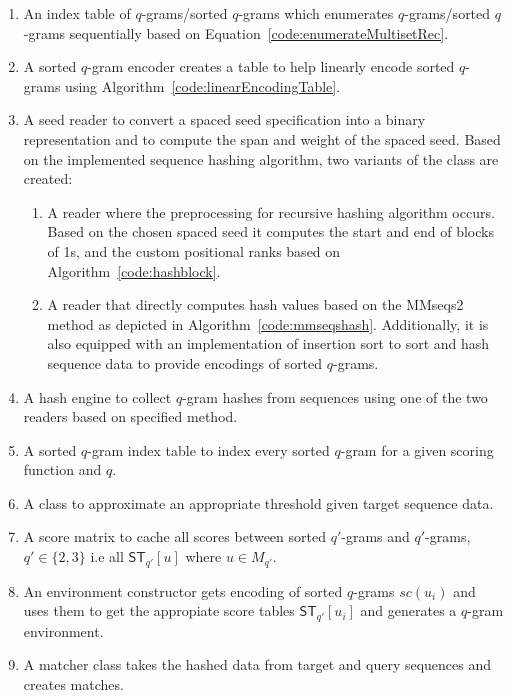\documentclass[twoside,a4paper,bsc]{master}
\newcommand{\Qgram}[1]{\(#1\)-gram}
\newcommand{\Scoretablename}[0]{\mathsf{ST}}
\newcommand{\Scoretable}[2]{\Scoretablename_{#1}[#2]}
\begin{document}
\begin{enumerate}
\item An index table of \Qgram{q}s/sorted \Qgram{q}s which enumerates
\Qgram{q}s/sorted \Qgram{q}s sequentially based on 
Equation~\ref{code:enumerateMultisetRec}.

\item A sorted \Qgram{q} encoder creates a table to help linearly encode
sorted \Qgram{q}s using Algorithm~\ref{code:linearEncodingTable}.

\item A seed reader to convert a spaced seed specification into a binary
representation and to compute the span and weight of the spaced seed.
Based on the implemented sequence hashing algorithm, two variants of the
class are created:

\begin{enumerate}
\item A reader where the preprocessing for recursive hashing algorithm occurs.
Based on the chosen spaced seed it computes the start and end of blocks of 1s,
and the custom positional ranks based on Algorithm~\ref{code:hashblock}.
\item A reader that directly computes hash values based on the MMseqs2 method
as depicted in Algorithm~\ref{code:mmseqshash}. Additionally, it is also 
equipped with an implementation of insertion sort to sort and hash sequence data
to provide encodings of sorted \Qgram{q}s.
\end{enumerate}

\item A hash engine to collect \Qgram{q} hashes from sequences using one of the 
two readers based on specified method.
\item A sorted \Qgram{q} index table to index every sorted \Qgram{q} for a
given scoring function and \(q\).
\item A class to approximate an appropriate threshold given target sequence
data.
\item A score matrix to cache all scores between sorted \Qgram{q'}s and
\Qgram{q'}s, \(q'\in\{2,3\}\) i.e all \(\Scoretable{q'}{u}\) where \(u\in M_{q'}\).
\item An environment constructor gets encoding of sorted \Qgram{q}s \(sc(u_i)\) 
and uses them to get the appropiate score tables \(\Scoretable{q'}{u_i}\) and 
generates a \Qgram{q} environment.
\item A matcher class takes the hashed data from target and query sequences and
creates matches.
\end{enumerate}
\end{document}
